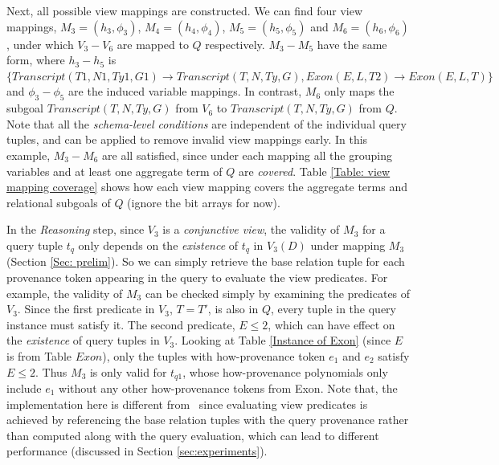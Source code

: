 \begin{example}
Next, all possible view mappings are constructed. We can find four view mappings, $M_3=(h_3,\phi_3)$, $M_4=(h_4, \phi_4)$, $M_5=(h_5, \phi_5)$ and $M_6=(h_6, \phi_6)$, under which $V_3-V_6$ are mapped to $Q$ respectively. $M_3-M_5$ have the same form, where $h_3-h_5$ is $\{Transcript(T1, N1, Ty1, G1) \rightarrow Transcript(T, N, Ty, G), Exon(E, L, T2)\rightarrow Exon(E, L, T)\}$ and $\phi_3-\phi_5$ are the induced variable mappings. In contrast, $M_6$ only maps the subgoal $Transcript(T, N, Ty, G)$ from $V_6$ to $Transcript(T, N, Ty, G)$ from $Q$. Note that all the {\em schema-level conditions} are independent of the individual query tuples, and can be applied to remove invalid view mappings early.  In this example, $M_3-M_6$ are all satisfied, since under each mapping all the grouping variables and at least one aggregate term of $Q$ are {\em covered}. Table \ref{Table: view mapping coverage} shows how each view mapping covers the aggregate terms and relational subgoals of $Q$ (ignore the bit arrays for now).

In the {\em Reasoning} step, since $V_3$ is a \textit{conjunctive view}, the validity of $M_3$ for a query tuple $t_q$ only depends on the {\em existence} of $t_q$ in $V_3(D)$ under mapping $M_3$ (Section \ref{Sec: prelim}). So we can simply retrieve the base relation tuple for each provenance token appearing in the query to evaluate the view {predicates}. For example, the validity of $M_3$ can be checked simply by examining the predicates of $V_3$. Since the first predicate in $V_3$, $T = T'$, is also in $Q$, every tuple in the query instance must satisfy it. The second predicate, $E \leq 2$, which can have effect on the {\em existence} of query tuples in $V_3$. Looking at Table \ref{Instance of Exon} (since $E$ is from Table $Exon$), only the tuples with how-provenance token $e_1$ and $e_2$ satisfy $E \leq 2$. Thus $M_3$ is only valid for $t_{{q}1}$, whose how-provenance polynomials only include $e_1$ without any other how-provenance tokens from Exon. Note that, the implementation here is different from \rba\ since evaluating view predicates is achieved by referencing the base relation tuples with the query provenance rather than computed along with the query evaluation, which can lead to different performance (discussed in Section \ref{sec:experiments}).


\end{example}
